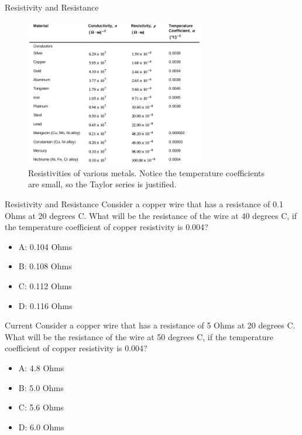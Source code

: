 \documentclass{beamer}
\begin{document}
\begin{frame}{Resistivity and Resistance}
\begin{figure}
\centering
\includegraphics[width=0.7\textwidth]{figures/resist.png}
\caption{\label{fig:resist2} Resistivities of various metals.  Notice the temperature coefficients are small, so the Taylor series is justified.}
\end{figure}
\end{frame}

\begin{frame}{Resistivity and Resistance}
Consider a copper wire that has a resistance of 0.1 Ohms at 20 degrees C.  What will be the resistance of the wire at 40 degrees C, if the temperature coefficient of copper resistivity is 0.004?
\begin{itemize}
\item A: 0.104 Ohms
\item B: 0.108 Ohms
\item C: 0.112 Ohms
\item D: 0.116 Ohms
\end{itemize}
\end{frame}

\begin{frame}{Current}
Consider a copper wire that has a resistance of 5 Ohms at 20 degrees C.  What will be the resistance of the wire at 50 degrees C, if the temperature coefficient of copper resistivity is 0.004?
\begin{itemize}
\item A: 4.8 Ohms
\item B: 5.0 Ohms
\item C: 5.6 Ohms
\item D: 6.0 Ohms
\end{itemize}
\end{frame}
\end{document}
